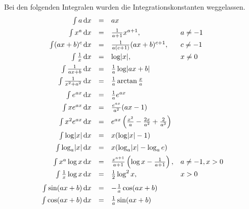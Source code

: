 Bei den folgenden Integralen wurden die Integrationskonstanten weggelassen.
\[
	\begin{array}{rcll}
		\int a                  \,\mathrm{d} x & = & ax                                                             &             \\[0.5em]
		\int x^a                \,\mathrm{d} x & = & \frac{1}{a+1} x^{a+1}                                        , & a \neq -1   \\[0.5em]
		\int (ax+b)^c           \,\mathrm{d} x & = & \frac{1}{a(c+1)}(ax+b)^{c+1}                                 , & c \neq -1   \\[0.5em]
		\int \frac{1}{x}        \,\mathrm{d} x & = & \log\lvert x \rvert                                                  , & x\neq 0     \\[0.5em]
		\int \frac{1}{ax+b}     \,\mathrm{d} x & = & \frac{1}{a} \log\lvert ax+b \rvert                                     &             \\[0.5em]
		\int \frac{1}{x^2+a^2}  \,\mathrm{d} x & = & \frac{1}{a}\arctan\frac{x}{a}                                  &             \\[0.75em]
		\int e^{ax}             \,\mathrm{d} x & = & \frac{1}{a}e^{ax}                                              &             \\[0.5em]
		\int x e^{ax}           \,\mathrm{d} x & = & \frac{e^{ax}}{a^2}(ax-1)                                       &             \\[0.5em]
		\int x^2 e^{ax}         \,\mathrm{d} x & = & e^{ax}\left(\frac{x^2}{a}-\frac{2x}{a^2}+\frac{2}{a^3}\right)  &             \\[0.75em]
		\int \log\lvert x \rvert        \,\mathrm{d} x & = & x(\log\lvert x \rvert - 1)                                             &             \\[0.5em]
		\int \log_a\lvert x \rvert      \,\mathrm{d} x & = & x(\log_a\lvert x \rvert-\log_a e)                                      &             \\[0.5em]
		\int x^a \log x         \,\mathrm{d} x & = & \frac{x^{a+1}}{a+1}\left(\log x - \frac{1}{a+1}\right)       , & a\neq-1,x>0 \\[0.5em]
		\int \frac{1}{x}\log x  \,\mathrm{d} x & = & \frac{1}{2}\log^2 x                                          , & x>0         \\[0.75em]
		\int \sin(ax+b)         \,\mathrm{d} x & = & -\frac{1}{a}\cos(ax+b)                                         &             \\[0.5em]
		\int \cos(ax+b)         \,\mathrm{d} x & = & \frac{1}{a}\sin(ax+b)                                          &             \\[0.5em]

\end{array}\]

